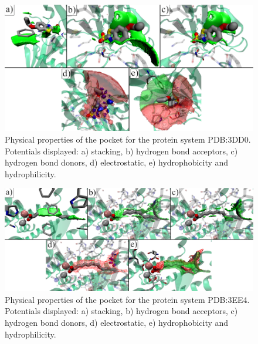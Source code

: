 \begin{figure}[H]
  \centering
  \includegraphics[width=1\textwidth]{figures/appendix/benchmark_prot/3dd0.png}
  \caption{\label{fig:appx_benchmark/3dd0} Physical properties of the pocket for the protein system PDB:3DD0. Potentials displayed: a) stacking, b) hydrogen bond acceptors, c) hydrogen bond donors, d) electrostatic, e) hydrophobicity and hydrophilicity.}
\end{figure}

\begin{figure}[H]
  \centering
  \includegraphics[width=1\textwidth]{figures/appendix/benchmark_prot/3ee4.png}
  \caption{\label{fig:appx_benchmark/3ee4} Physical properties of the pocket for the protein system PDB:3EE4. Potentials displayed: a) stacking, b) hydrogen bond acceptors, c) hydrogen bond donors, d) electrostatic, e) hydrophobicity and hydrophilicity.}
\end{figure}

